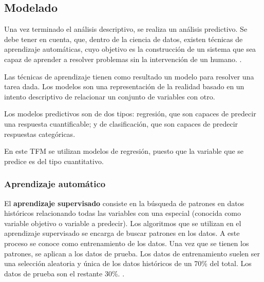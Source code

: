

\subsection{Modelado}
Una vez terminado el análisis descriptivo, se realiza un análisis predictivo. Se debe tener en cuenta, que, dentro de la ciencia de datos, existen técnicas de aprendizaje automáticas, cuyo objetivo es la construcción de un sistema que sea capaz de aprender a resolver problemas sin la intervención de un humano. \cite{MARIN2018}.

Las técnicas de aprendizaje tienen como resultado un modelo para resolver una tarea dada. Los modelos son una representación de la realidad basado en un intento descriptivo de relacionar un conjunto de variables con otro.

Los modelos predictivos son de dos tipos: regresión, que son capaces de predecir una respuesta cuantificable; y de clasificación, que son capaces de predecir respuestas categóricas.

En este TFM se utilizan modelos de regresión, puesto que la variable que se predice es del tipo cuantitativo.

\subsubsection{Aprendizaje automático}

El \textbf{aprendizaje supervisado} consiste en la búsqueda de patrones en datos históricos relacionando todas las variables con una especial (conocida como variable objetivo o variable a predecir). Los algoritmos que se utilizan en el aprendizaje supervisado se encarga de buscar patrones en los datos. A este proceso se conoce como entrenamiento de los datos. Una vez que se tienen los patrones, se aplican a los datos de prueba. Los datos de entrenamiento suelen ser una selección aleatoria y única de los datos históricos de un 70\% del total. Los datos de prueba son el restante 30\%. \cite{Manguart2017}.

